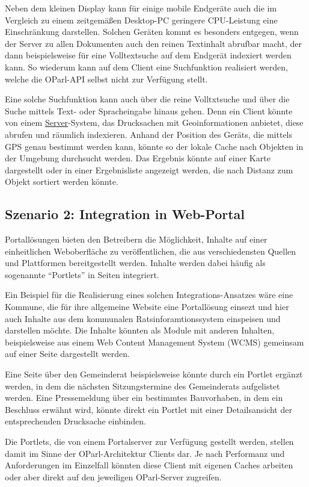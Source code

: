 \documentclass[,a4paper]{article}
\begin{document}
Neben dem kleinen Display kann für einige mobile Endgeräte auch die im
Vergleich zu einem zeitgemäßen Desktop-PC geringere CPU-Leistung eine
Einschränkung darstellen. Solchen Geräten kommt es besonders entgegen,
wenn der Server zu allen Dokumenten auch den reinen Textinhalt abrufbar
macht, der dann beispielsweise für eine Volltextsuche auf dem Endgerät
indexiert werden kann. So wiederum kann auf dem Client eine Suchfunktion
realisiert werden, welche die OParl-API selbst nicht zur Verfügung
stellt.

Eine solche Suchfunktion kann auch über die reine Volltxtsuche und über
die Suche mittels Text- oder Spracheingabe hinaus gehen. Denn ein Client
könnte von einem \hyperref[server]{Server}-System, das Drucksachen mit
Geoinformationen anbietet, diese abrufen und räumlich indexieren. Anhand
der Position des Geräts, die mittels GPS genau bestimmt werden kann,
könnte so der lokale Cache nach Objekten in der Umgebung durchsucht
werden. Das Ergebnis könnte auf einer Karte dargestellt oder in einer
Ergebnisliste angezeigt werden, die nach Distanz zum Objekt sortiert
werden könnte.

\subsection{Szenario 2: Integration in
Web-Portal}\label{szenarioux5fwebux5fportal}

Portallösungen bieten den Betreibern die Möglichkeit, Inhalte auf einer
einheitlichen Weboberfläche zu veröffentlichen, die aus verschiedensten
Quellen und Plattformen bereitgestellt werden. Inhalte werden dabei
häufig als sogenannte ``Portlets'' in Seiten integriert.

Ein Beispiel für die Realisierung eines solchen Integrations-Ansatzes
wäre eine Kommune, die für ihre allgemeine Website eine Portallösung
einsezt und hier auch Inhalte aus dem kommunalen Ratsinforamtionssystem
einspeisen und darstellen möchte. Die Inhalte könnten als Module mit
anderen Inhalten, beispielsweise aus einem Web Content Management System
(WCMS) gemeinsam auf einer Seite dargestellt werden.

Eine Seite über den Gemeinderat beispielsweise könnte durch ein Portlet
ergänzt werden, in dem die nächsten Sitzungstermine des Gemeinderats
aufgelistet werden. Eine Pressemeldung über ein bestimmtes Bauvorhaben,
in dem ein Beschluss erwähnt wird, könnte direkt ein Portlet mit einer
Detailsansicht der entsprechenden Drucksache einbinden.

Die Portlets, die von einem Portalserver zur Verfügung gestellt werden,
stellen damit im Sinne der OParl-Architektur Clients dar. Je nach
Performanz und Anforderungen im Einzelfall könnten diese Client mit
eigenen Caches arbeiten oder aber direkt auf den jeweiligen OParl-Server
zugreifen.
\end{document}
